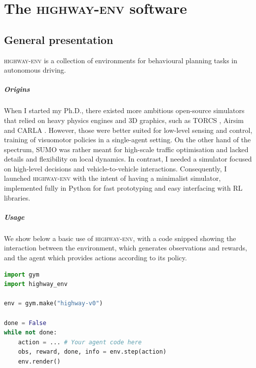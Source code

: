 \graphicspath{{3-Appendices/1-Appendix/}}

\chapter{The \textsc{highway-env} software}

\minitocStartChapterNoNewPage{}

\label{chapter:a}

\section{General presentation}

\textsc{highway-env} is a collection of environments for behavioural planning tasks in autonomous driving.

\paragraph{Origins}
When I started my Ph.D., there existed more ambitious open-source simulators that relied on heavy physics engines and 3D graphics, such as TORCS \citep{Wymann15torcs:the}, Airsim \citep{shah2017airsim} and CARLA \citep{Dosovitskiy2017}. However, those were better suited for low-level sensing and control, \eg training of visuomotor policies in a single-agent setting. On the other hand of the spectrum, SUMO \citep{SUMO2018} was rather meant for high-scale traffic optimisation and lacked details and flexibility on local dynamics. In contrast, I needed a simulator focused on high-level decisions and vehicle-to-vehicle interactions. Consequently, I launched \textsc{highway-env} with the intent of having a minimalist simulator, implemented fully in Python for fast prototyping and easy interfacing with \gls{RL} libraries.

\paragraph{Usage}
We show below a basic use of \textsc{highway-env}, with a code snipped showing the interaction between the environment, which generates observations and rewards, and the agent which provides actions according to its policy.

\begin{lstlisting}[language=Python,frame=single,caption={Create, step and render the \texttt{highway-v0} environment},captionpos=b]
import gym
import highway_env

env = gym.make("highway-v0")

done = False
while not done:
    action = ... # Your agent code here
    obs, reward, done, info = env.step(action)
    env.render()
\end{lstlisting}

